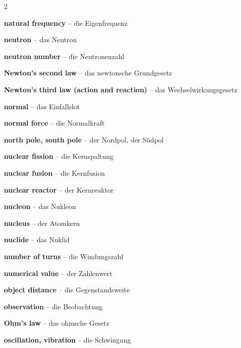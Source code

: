 \begin{multicols}{2}
\par\nopagebreak
\textbf{natural frequency} -- die Eigenfrequenz\dotfill\hyperref[e:199]{\pageref*{e:199}}\par
\textbf{neutron} -- das Neutron\dotfill\hyperref[e:264]{\pageref*{e:264}}\par
\textbf{neutron number} -- die Neutronenzahl\dotfill\hyperref[e:269]{\pageref*{e:269}}\par
\textbf{Newton's second law} -- das newtonsche Grundgesetz\dotfill\hyperref[e:77]{\pageref*{e:77}}\par
\textbf{Newton's third law (action and reaction)} -- das Wechselwirkungsgesetz\dotfill\hyperref[e:78]{\pageref*{e:78}}\par
\textbf{normal} -- das Einfallslot\dotfill\hyperref[e:229]{\pageref*{e:229}}\par
\textbf{normal force} -- die Normalkraft\dotfill\hyperref[e:64]{\pageref*{e:64}}\par
\textbf{north pole, south pole} -- der Nordpol, der Südpol\dotfill\hyperref[e:177]{\pageref*{e:177}}\par
\textbf{nuclear fission} -- die Kernspaltung\dotfill\hyperref[e:285]{\pageref*{e:285}}\par
\textbf{nuclear fusion} -- die Kernfusion\dotfill\hyperref[e:286]{\pageref*{e:286}}\par
\textbf{nuclear reactor} -- der Kernreaktor\dotfill\hyperref[e:288]{\pageref*{e:288}}\par
\textbf{nucleon} -- das Nukleon\dotfill\hyperref[e:265]{\pageref*{e:265}}\par
\textbf{nucleus} -- der Atomkern\dotfill\hyperref[e:260]{\pageref*{e:260}}\par
\textbf{nuclide} -- das Nuklid\dotfill\hyperref[e:270]{\pageref*{e:270}}\par
\textbf{number of turns} -- die Windungszahl\dotfill\hyperref[e:182]{\pageref*{e:182}}\par
\textbf{numerical value} -- der Zahlenwert\dotfill\hyperref[e:2]{\pageref*{e:2}}\par

\par\nopagebreak
\textbf{object distance} -- die Gegenstandsweite\dotfill\hyperref[e:246]{\pageref*{e:246}}\par
\textbf{observation} -- die Beobachtung\dotfill\hyperref[e:18]{\pageref*{e:18}}\par
\textbf{Ohm's law} -- das ohmsche Gesetz\dotfill\hyperref[e:147]{\pageref*{e:147}}\par
\textbf{oscillation, vibration} -- die Schwingung\dotfill\hyperref[e:190]{\pageref*{e:190}}\par


\end{multicols}
